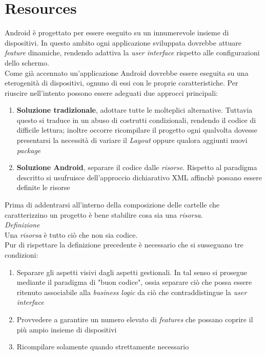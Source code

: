 \documentclass{article}
\begin{document}
\pagestyle{empty}

\section*{Resources}
\large
Android è progettato per essere eseguito su un innumerevole insieme di dispositivi. In questo ambito ogni applicazione sviluppata dovrebbe attuare \textit{feature} dinamiche, rendendo adattiva la \textit{user interface} rispetto alle configurazioni dello schermo.\vspace*{14pt}\\
Come già accennato un'applicazione Android dovrebbe essere eseguita su una eterogenità di dispositivi, ognuno di essi con le proprie caratteristiche. Per riuscire nell'intento possono essere adeguati due approcci principali:
\begin{enumerate}
    \itemsep0em
    \renewcommand*{\labelenumi}{-}
    \item \textbf{Soluzione tradizionale}, adottare tutte le molteplici alternative. Tuttavia questo si traduce in un abuso di costrutti condizionali, rendendo il codice di difficile lettura; inoltre occorre ricompilare il progetto ogni qualvolta dovesse presentarsi la necessità di variare il \textit{Layout} oppure qualora aggiunti nuovi \textit{package}
    \item \textbf{Soluzione Android}, separare il codice dalle \textit{risorse}. Rispetto al paradigma descritto si usufruisce dell'approccio dichiarativo XML affinchè possano essere definite le risorse
\end{enumerate}
Prima di addentrarsi all'interno della composizione delle cartelle che caratterizzino un progetto è bene stabilire cosa sia una \textit{risorsa}.\vspace*{7pt}\\
\textit{Definizione}\\
Una \textit{risorsa} è tutto ciò che non sia codice.\vspace*{7pt}\\
Pur di rispettare la definizione precedente è necessario che si susseguano tre condizioni:
\begin{enumerate}
    \itemsep0em
    \renewcommand*{\labelenumi}{-}
    \item Separare gli aspetti visivi dagli aspetti gestionali. In tal senso si prosegue mediante il paradigma di "buon codice", ossia separare ciò che possa essere ritenuto associabile alla \textit{business logic} da ciò che contraddistingue la \textit{user interface}
    \item Provvedere a garantire un numero elevato di \textit{features} che possano coprire il più ampio insieme di dispositivi
    \item Ricompilare solamente quando strettamente necessario
\end{enumerate}
\end{document}
